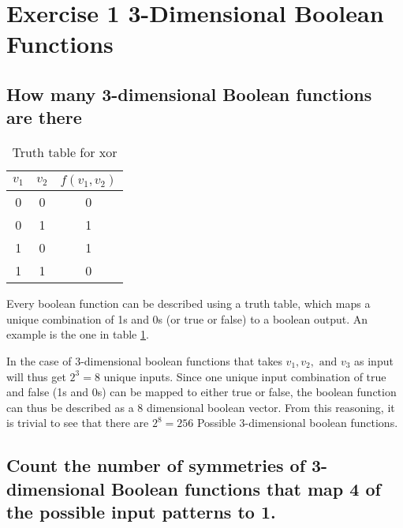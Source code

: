 \section{Exercise 1 3-Dimensional Boolean Functions}

\subsection{How many 3-dimensional Boolean functions are there}

\ans

\begin{table}[h]
    \centering
    \begin{tabular}{|c c|c|}
        \hline
        $v_1$ & $v_2$ & \cellcolor{gray!25}$f(v_1,v_2)$\\
        \hline 
        0 & 0 & 0 \\
        0 & 1 & 1 \\
        1 & 0 & 1 \\
        1 & 1 & 0 \\
        \hline
    \end{tabular}
    \caption{Truth table for xor}
    \label{tab:xor}
\end{table}    

Every boolean function can be described using a truth table, which maps a unique combination of 1s and 0s (or true or false) to a boolean output. An example is the one in table \ref{tab:xor}.

In the case of 3-dimensional boolean functions that takes $v_1,v_2,\text{ and }v_3$ as input will thus get $2^3 = 8$ unique inputs. Since one unique input combination of true and false (1s and 0s) can be mapped to either true or false, the boolean function can thus be described as a 8 dimensional boolean vector. From this reasoning, it is trivial to see that there are $2^8 = 256$ Possible 3-dimensional boolean functions.

\subsection{Count the number of symmetries of 3-dimensional Boolean functions that map 4 of the possible input patterns to 1.}